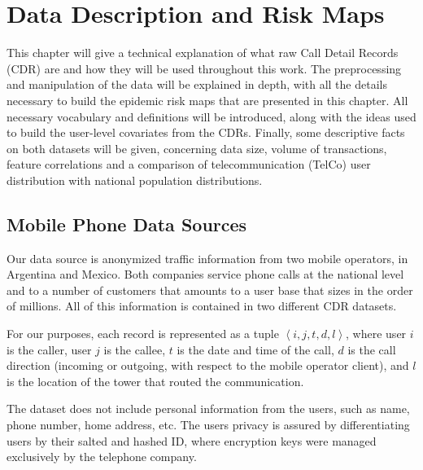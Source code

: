 

\chapter{Data Description and Risk Maps}\label{ch:descr-risk}

This chapter will give a technical explanation of what raw Call Detail Records (CDR) are and how they will be used throughout this work.
The preprocessing and manipulation of the data will be explained in depth, with all the details necessary to build the epidemic risk maps that are presented in this chapter.
All necessary vocabulary and definitions will be introduced, along with the ideas used to build the user-level covariates from the CDRs.
Finally, some descriptive facts on both datasets will be given, concerning data size, volume of transactions, feature correlations and a comparison of telecommunication (TelCo) user distribution with national population distributions.


\section{Mobile Phone Data Sources}

Our data source is anonymized traffic information from two mobile operators, in Argentina and Mexico.
Both companies service phone calls at the national level and to a number of customers that amounts to a user base that sizes in the order of millions.
All of this information is contained in two different CDR datasets.

For our purposes, each record is represented as a tuple $\left < i, j, t, d, l \right >$, where user $i$ is the caller, user $j$ is the callee, $t$ is the date and time of the call, $d$ is the call direction (incoming or outgoing, with respect to the mobile operator client), and $l$ is the location of the tower that routed the communication.

The dataset does not include personal information from the users, such as name, phone number, home address, etc.
The users privacy is assured by differentiating users by their salted and hashed ID, where encryption keys were managed exclusively by the telephone company.

